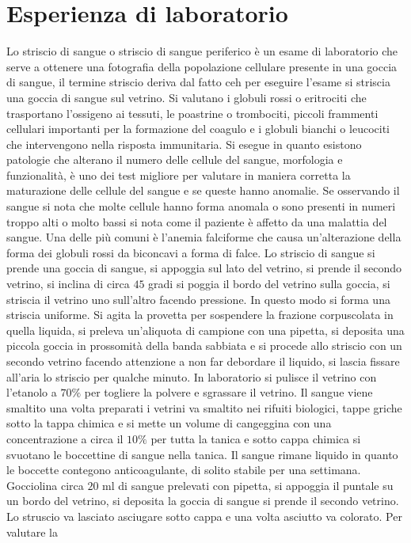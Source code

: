 \chapter{Esperienza di laboratorio}
Lo striscio di sangue o striscio di sangue periferico \`e un esame di laboratorio che serve a ottenere una fotografia della popolazione cellulare presente in una goccia di sangue, il 
termine striscio deriva dal fatto ceh per eseguire l'esame si striscia una goccia di sangue sul vetrino. Si valutano i globuli rossi o eritrociti che trasportano l'ossigeno ai 
tessuti, le poastrine o trombociti, piccoli frammenti cellulari importanti per la formazione del coagulo e i globuli bianchi o leucociti che intervengono nella risposta immunitaria. 
Si esegue in quanto esistono patologie che alterano il numero delle cellule del sangue, morfologia e funzionalit\`a, \`e uno dei test migliore per valutare in maniera corretta la 
maturazione delle cellule del sangue e se queste hanno anomalie. Se osservando il sangue si nota che molte cellule hanno forma anomala o sono presenti in numeri troppo alti o molto
bassi si nota come il paziente \`e affetto da una malattia del sangue. Una delle pi\`u comuni \`e l'anemia falciforme che causa un'alterazione della forma dei globuli rossi da 
biconcavi a forma di falce. Lo striscio di sangue si prende una goccia di sangue, si appoggia sul lato del vetrino, si prende il secondo vetrino, si inclina di circa $45$ gradi si 
poggia il bordo del vetrino sulla goccia, si striscia il vetrino uno sull'altro facendo pressione. In questo modo si forma una striscia uniforme. Si agita la provetta per sospendere la
frazione corpuscolata in quella liquida, si preleva un'aliquota di campione con una pipetta, si deposita una piccola goccia in prossomit\`a della banda sabbiata e si procede allo
striscio con un secondo vetrino facendo attenzione a non far debordare il liquido, si lascia fissare all'aria lo striscio per qualche minuto. In laboratorio si pulisce il vetrino con
l'etanolo a $70\%$ per togliere la polvere e sgrassare il vetrino. Il sangue viene smaltito una volta preparati i vetrini va smaltito nei rifuiti biologici, tappe griche sotto la tappa
chimica e si mette un volume di cangeggina con una concentrazione a circa il $10\%$ per tutta la tanica e sotto cappa chimica si svuotano le boccettine di sangue nella tanica. Il sangue
rimane liquido in quanto le boccette contegono anticoagulante, di solito stabile per una settimana. Gocciolina circa $20$ ml di sangue prelevati con pipetta, si appoggia il puntale su
un bordo del vetrino, si deposita la goccia di sangue si prende il secondo vetrino. Lo struscio va lasciato asciugare sotto cappa e una volta asciutto va colorato. Per valutare la 
